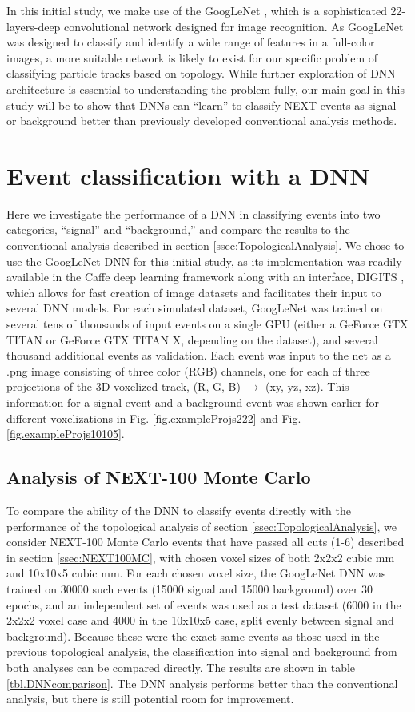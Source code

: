 \documentclass[a4paper,11pt]{article}
\begin{document}
In this initial study, we make use of the GoogLeNet \cite{Googlenet}, which is a sophisticated 22-layers-deep convolutional network designed for image recognition.  As GoogLeNet was
designed to classify and identify a wide range of features in a full-color images, a more suitable network is likely to exist for our specific problem of classifying particle tracks based on
topology.  While further exploration of DNN architecture is essential to understanding the problem fully, our main goal in this study will be to show that DNNs can ``learn'' to classify 
NEXT events as signal or background better than previously developed conventional analysis methods.

\section{Event classification with a DNN}
Here we investigate the performance of a DNN in classifying events into two categories, ``signal'' and ``background,'' and compare the results to the conventional analysis described in
section \ref{ssec:TopologicalAnalysis}.  We chose to use the GoogLeNet DNN for this initial study, as its implementation was readily available in the Caffe \cite{jia2014caffe}
deep learning framework along with an interface, DIGITS \cite{DIGITS}, which allows for fast creation of image datasets and facilitates their input to several DNN models.  For each simulated
dataset, GoogLeNet was trained on several tens of thousands of input events on a single GPU (either a GeForce GTX TITAN or GeForce GTX TITAN X, depending on the dataset), and several
thousand additional events as validation.  Each event was input to the net as a .png image consisting of three
color (RGB) channels, one for each of three projections of the 3D voxelized track, (R, G, B) $\rightarrow$ (xy, yz, xz).  This information for a signal event and a background event was
shown earlier for different voxelizations in Fig. \ref{fig.exampleProjs222} and Fig. \ref{fig.exampleProjs10105}.

\subsection{Analysis of NEXT-100 Monte Carlo}\label{ssec:NEXTMCanalysis}
To compare the ability of the DNN to classify events directly with the performance of the topological analysis of section \ref{ssec:TopologicalAnalysis}, we consider NEXT-100 Monte Carlo 
events that have passed all cuts (1-6) described in section \ref{ssec:NEXT100MC}, with chosen voxel sizes of both 2x2x2 cubic mm and 10x10x5 cubic mm.  For each chosen voxel size, the 
GoogLeNet DNN was trained on 30000 such events (15000 signal and 15000 background) over 30 epochs, 
and an independent set of events was used as a test dataset (6000 in the 2x2x2 voxel case and 4000 in the 10x10x5 case, split evenly between signal and background).  Because these were 
the exact same events as those used in the previous
topological analysis, the classification into signal and background from both analyses can be compared directly.  The results are shown in table \ref{tbl.DNNcomparison}.  The DNN
analysis performs better than the conventional analysis, but there is still potential room for improvement.  
\end{document}
